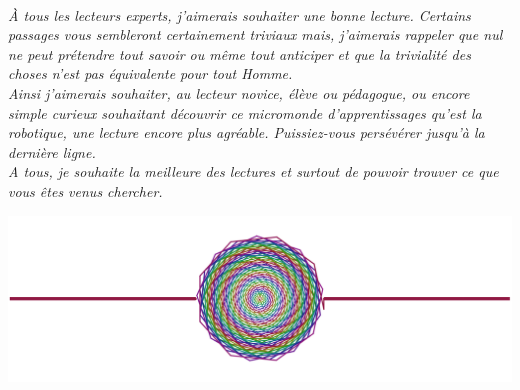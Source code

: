 \strut\vspace{2cm}
\newline\strut\hfill
\begin{minipage}{0.78\linewidth}
\dediFont\dediFont

\dediFont

\dediFont


\\\vspace{1.5cm}
\textit{À tous les lecteurs experts, j'aimerais souhaiter une bonne lecture. Certains passages vous sembleront certainement triviaux mais, j'aimerais rappeler que nul ne peut prétendre tout savoir ou même tout anticiper et que la trivialité des choses n'est pas équivalente pour tout Homme.\\\vspace{0.5cm}
Ainsi j'aimerais souhaiter, au lecteur novice, élève ou pédagogue, ou encore simple curieux souhaitant découvrir ce micromonde d'apprentissages qu'est la robotique, une lecture encore plus agréable. Puissiez-vous persévérer jusqu'à la dernière ligne.\\\vspace{0.5cm}
A tous, je souhaite la meilleure des lectures et surtout de pouvoir trouver ce que vous êtes venus chercher.}

\begin{center}
\includegraphics[width=0.25\linewidth]{Texte/Partie0/Preface/rond.png}
\end{center}
\end{minipage}
\hfill\strut\newline\vfill